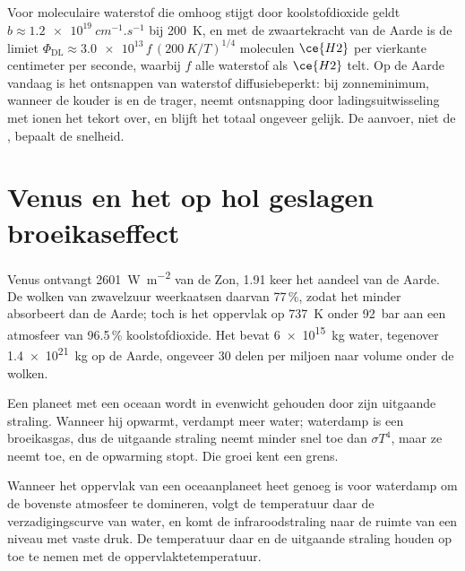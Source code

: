 Voor moleculaire waterstof die omhoog stijgt door koolstofdioxide geldt $b \approx
\qty{1.2e19}{cm^{-1}.s^{-1}}$ bij \qty{200}{K}, en met de zwaartekracht van de Aarde
is de limiet $\Phi_\mathrm{DL} \approx
\num{3.0e13}\,f\,(\qty{200}{K}/T)^{1/4}$ moleculen $\ce{H2}$ per vierkante
centimeter per seconde, waarbij $f$ alle waterstof als $\ce{H2}$ telt. Op
de Aarde vandaag is het ontsnappen van waterstof diffusiebeperkt: bij zonneminimum,
wanneer de  kouder is en de  trager, neemt ontsnapping door
ladingsuitwisseling met ionen het tekort over, en blijft het totaal ongeveer gelijk.
De aanvoer, niet de
, bepaalt de snelheid.

\section{Venus en het op hol geslagen broeikaseffect}\label{sec:b3:planetary-atmospheres:venus}

Venus ontvangt \qty{2601}{W.m^{-2}} van de Zon, 1.91 keer het aandeel van de
Aarde. De wolken van zwavelzuur weerkaatsen daarvan 77\,\%, zodat het minder absorbeert
dan de Aarde; toch is het oppervlak op \qty{737}{K} onder \qty{92}{bar}
aan een atmosfeer van 96.5\,\% koolstofdioxide. Het bevat \qty{6e15}{kg} water,
tegenover \qty{1.4e21}{kg} op de Aarde, ongeveer 30
delen per miljoen naar volume onder de wolken.

Een planeet met een oceaan wordt in evenwicht gehouden door zijn uitgaande straling. Wanneer
hij opwarmt, verdampt meer water; waterdamp is een broeikasgas, dus de
uitgaande straling neemt minder snel toe dan $\sigma T^4$, maar ze neemt toe, en de
opwarming stopt. Die groei kent een grens.

\begin{proposition}\label{prop:b3:planetary-atmospheres:limit}
Wanneer het oppervlak van een oceaanplaneet heet genoeg is voor waterdamp om
de bovenste atmosfeer te domineren, volgt de temperatuur daar de
verzadigingscurve van water, en komt de infraroodstraling naar de ruimte van
een niveau met vaste druk. De temperatuur daar en de uitgaande straling
houden op toe te nemen met de oppervlaktetemperatuur.
\end{proposition}

